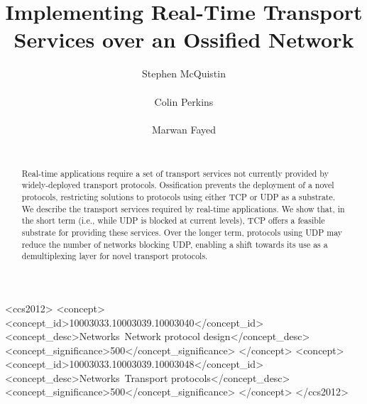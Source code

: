 \documentclass[10pt]{sig-alternate-05-2015}
\begin{document}
\title{Implementing Real-Time Transport Services over an Ossified Network}
\author{
  \alignauthor
    Stephen McQuistin\\
    \\
  \alignauthor
    Colin Perkins\\
    \\
  \alignauthor
    Marwan Fayed\\
    \\
}

\toappear{}
\maketitle
\begin{abstract}


Real-time applications require a set of transport services not currently
provided by widely-deployed transport protocols. Ossification prevents the
deployment of a novel protocols, restricting solutions to protocols using
either TCP or UDP as a substrate. We describe the transport services
required by real-time applications. We show that, in the short term (i.e.,
while UDP is blocked at current levels), TCP offers a feasible substrate
for providing these services. Over the longer term, protocols using UDP
may reduce the number of networks blocking UDP, enabling a shift towards
its use as a demultiplexing layer for novel transport protocols.

\end{abstract}
\begin{CCSXML}
  <ccs2012>
    <concept>
      <concept_id>10003033.10003039.10003040</concept_id>
      <concept_desc>Networks~Network protocol design</concept_desc>
      <concept_significance>500</concept_significance>
    </concept>
    <concept>
      <concept_id>10003033.10003039.10003048</concept_id>
      <concept_desc>Networks~Transport protocols</concept_desc>
      <concept_significance>500</concept_significance>
    </concept>
  </ccs2012>
\end{CCSXML}
\end{document}
